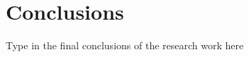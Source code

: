 \def\baselinestretch{1}
\chapter{Conclusions}
\graphicspath{{Conclusions/ConclusionsFigs/EPS/}{Conclusions/ConclusionsFigs/}}
\def\baselinestretch{1.66}

Type in the final conclusions of the research work here 

